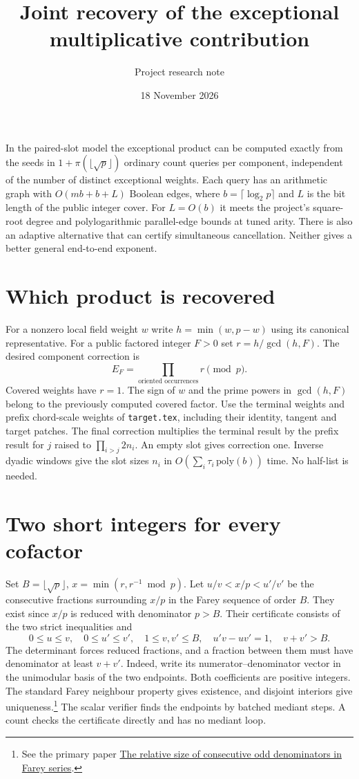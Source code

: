 \documentclass[11pt]{article}
\title{Joint recovery of the exceptional multiplicative contribution}
\author{Project research note}
\date{18 November 2026}
\begin{document}
\maketitle

In the paired-slot model the exceptional product can be computed exactly
from the seeds in $1+\pi(\lfloor\sqrt p\rfloor)$ ordinary count queries per
component, independent of the number of distinct exceptional weights.
Each query has an arithmetic graph with $O(mb+b+L)$ Boolean edges,
where $b=\lceil\log_2p\rceil$ and $L$ is the bit length of the public
integer cover. For $L=O(b)$ it meets the project's square-root degree
and polylogarithmic parallel-edge bounds at tuned arity. There is also an adaptive alternative that
can certify simultaneous cancellation. Neither gives a better general
end-to-end exponent.

\section{Which product is recovered}
For a nonzero local field weight $w$ write $h=\min(w,p-w)$ using its
canonical representative. For a public factored integer $F>0$ set
$r=h/\gcd(h,F)$. The desired component correction is
\[
                         E_F=\prod_{\text{oriented occurrences}} r \pmod p .
\]
Covered weights have $r=1$. The sign of $w$ and the prime powers in
$\gcd(h,F)$ belong to the previously computed covered factor. Use
the terminal weights and prefix chord-scale weights of
\texttt{target.tex}, including their identity, tangent and target
patches. The final correction multiplies the terminal result by the
prefix result for $j$ raised to $\prod_{i>j}2n_i$. An empty slot gives
correction one. Inverse dyadic windows give the slot sizes $n_i$ in
$O(\sum_i\tau_i\,\mathrm{poly}(b))$ time. No half-list is needed.

\section{Two short integers for every cofactor}
Set $B=\lfloor\sqrt p\rfloor$, $x=\min(r,r^{-1}\bmod p)$.
Let $u/v<x/p<u'/v'$ be the consecutive fractions surrounding $x/p$
in the Farey sequence of order $B$. They exist since $x/p$ is reduced
with denominator $p>B$. Their certificate consists of the two strict
inequalities and
\[
 0\le u\le v,\quad 0\le u'\le v',\quad 1\le v,v'\le B,\quad
 u'v-uv'=1,\quad v+v'>B .
\]
The determinant forces reduced fractions, and a fraction between
them must have denominator at least $v+v'$. Indeed, write its
numerator--denominator vector in the unimodular basis of the two
endpoints. Both coefficients are positive integers. The standard
Farey neighbour property gives existence, and disjoint interiors give
uniqueness.\footnote{See the primary paper
\href{https://math.colgate.edu/~integers/d7/d7.pdf}{The relative size of consecutive odd denominators in Farey series}.}
The scalar verifier finds the endpoints by batched mediant steps. A
count checks the certificate directly and has no mediant loop.
\end{document}
